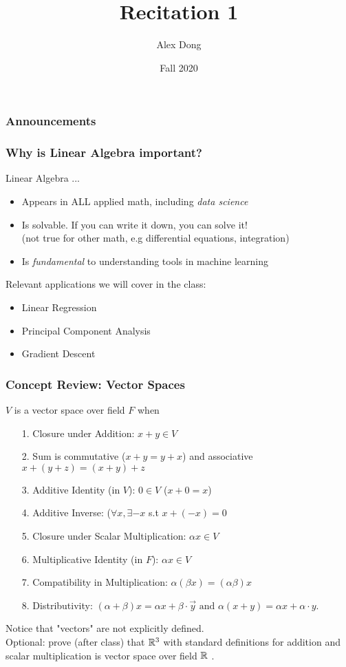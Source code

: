 \documentclass{beamer}
\title{Recitation 1 }
\author{Alex Dong}
\institute{CDS, NYU}
\date{Fall 2020}
\newcommand\Fonteight{\fontsize{8}{9.6}\selectfont}
\begin{document}
\frame{\titlepage} 
\begin{frame}
\frametitle{Announcements}
\end{frame}

\begin{frame}
\frametitle{Why is Linear Algebra important?}
Linear Algebra ...
\begin{itemize}
\item Appears in ALL applied math, including \textit{data science}
\item Is solvable. If you can write it down, you can solve it! \\
    \qquad (not true for other math, e.g differential equations, integration)
\item Is \textit{fundamental} to understanding tools in machine learning

\end{itemize}

Relevant applications we will cover in the class:
\begin{itemize}
\item Linear Regression
\item Principal Component Analysis
\item Gradient Descent
\end{itemize}

\end{frame}
\begin{frame}
\frametitle{Concept Review: Vector Spaces}
\begin{definition}
	    
	    $V$ is a vector space over field $F$ when
	    \Fonteight
		\begin{enumerate}
		\item[1.] Closure under Addition: $x+y \in V$
		\item[2.] Sum is commutative ($x+y = y+x$) and associative $x+(y+z)= (x+y)+z$
		\item[3.] Additive Identity (in $V$): $0\in V$ ($x+0 =x$)
		\item[4.] Additive Inverse: ($\forall x, \exists -x $ s.t $ x+(-x)=0$
		\item[5.] Closure under Scalar Multiplication: $\alpha x \in V$
		\item[6.] Multiplicative Identity (in $F$): $\alpha x \in V$
		\item[7.] Compatibility in Multiplication: $\alpha (\beta x) = (\alpha \beta) x $
		\item[8.] Distributivity: $(\alpha + \beta) x = \alpha x + \beta \cdot \vec{y}
			 \text{ and }
			\alpha  (x + y) = \alpha  x + \alpha \cdot y.$
		\end{enumerate}
\end{definition}
Notice that "vectors" are not explicitly defined. \\

Optional: prove (after class) that $\mathbb{R}^3$ with standard definitions for addition and scalar multiplication is vector space over field $\mathbb{R}$ .

\end{frame}
\end{document}
